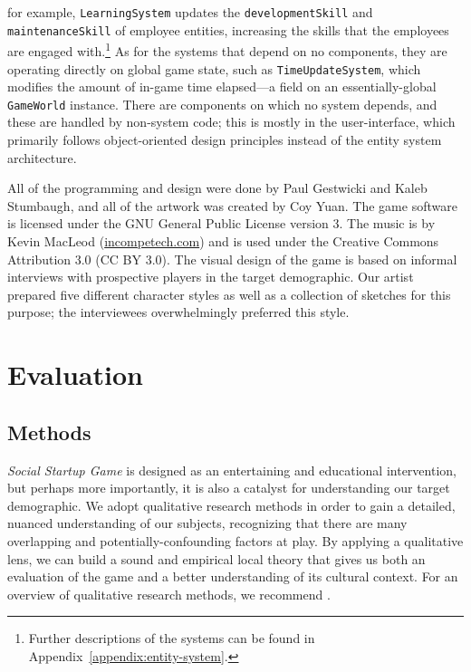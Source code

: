 \documentclass[letterpaper]{article}
\begin{document}
for example, \texttt{LearningSystem} updates the
\texttt{developmentSkill} and \texttt{maintenanceSkill} of employee
entities, increasing the skills that the employees are engaged
with.\footnote{Further descriptions of the systems can be found in
  Appendix~\ref{appendix:entity-system}.}  As for the systems that
depend on no components, they are operating directly on global game
state, such as \texttt{TimeUpdateSystem}, which modifies the amount of
in-game time elapsed---a field on an essentially-global
\texttt{GameWorld} instance.
There are components on which no system depends, and these are handled
by non-system code; this is mostly in the user-interface, which primarily
follows object-oriented design principles instead of the entity
system architecture.

All of the programming and design were done by Paul Gestwicki and
Kaleb Stumbaugh, and all of the artwork was created by Coy Yuan.  
The game software is licensed under the GNU General Public License
version 3.
The music is by Kevin MacLeod (\url{incompetech.com}) and is used under the
Creative Commons Attribution 3.0 (CC BY 3.0).
%
The visual design of the game is based on informal interviews with
prospective players in the target demographic. Our artist prepared
five different character styles as well as a collection of sketches
for this purpose; the interviewees overwhelmingly preferred this
style.


\section{Evaluation}
\label{sec:evaluation}

\subsection{Methods}

\textit{Social Startup Game} is designed as an entertaining and educational
intervention, but perhaps more importantly, it is also a catalyst
for understanding our target demographic.
We adopt qualitative research methods in order to gain a detailed,
nuanced understanding of our subjects, recognizing that there are
many overlapping and potentially-confounding factors at play.
By applying a qualitative lens, we can build a sound and empirical local
theory that gives us both an evaluation of the game and a better understanding
of its cultural context. For an overview of qualitative research methods,
we recommend \citet{Stake2010}.
\end{document}
